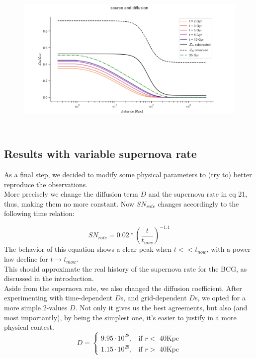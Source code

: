 \documentclass{article}
\begin{document}
\begin{figure}[ht]
 \begin{minipage}[b]{8cm}
   
   \includegraphics[trim = 0 0 0 0,width=16cm]{diff_sorg.png}
 \end{minipage}
 \ \hspace{2mm} \hspace{1mm} \
\end{figure}


\subsection{Results with variable supernova rate}
As a final step, we decided to modify some physical parameters to (try to) better reproduce the observations. \\  More precisely we change the diffusion term $D$ and the supernova rate in eq 21, thus, making them no more constant. Now $SN_{rate}$ changes accordingly to the following time relation:

\begin{equation}
    SN_{rate} = 0.02*(\frac{t}{t_{now}})^{-1.1}
\end{equation}
The behavior of this equation shows a clear peak when $t << t_{now}$, with a power law decline for $t \rightarrow t_{mow}$.\\ This should approximate the real history of the supernova rate for the BCG, as discussed in the introduction.\\ Aside from the supernova rate, we also changed the diffusion coefficient. After experimenting with time-dependent $D$s, and grid-dependent $D$s, we opted for a more simple 2-values $D$. Not only it gives us the best agreements, but also (and most importantly), by being the simplest one, it's easier to justify in a more physical contest.   
\begin{equation*}
    D = \begin{cases} 9.95\cdot 10^{28}, & \mbox{if } r <\mbox{ 40} \mbox{Kpc}\\ 
        1.15\cdot 10^{29}, & \mbox{if } r >\mbox{ 40} \mbox{Kpc}
\end{cases}
\end{equation*}
\end{document}
